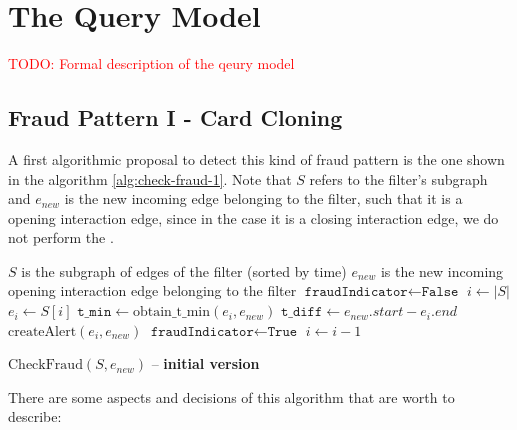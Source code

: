 \newpage
\section{The Query Model}

\textcolor{red}{TODO: Formal description of the qeury model\\}

\subsection{Fraud Pattern I - Card Cloning}

A first algorithmic proposal to detect this kind of fraud pattern is the one shown in the algorithm
\ref{alg:check-fraud-1}. Note that $S$ refers to the filter's subgraph and $e_{new}$ is the new incoming edge belonging to the filter, such that it is a opening interaction edge, since in the case it is a closing interaction edge, we do not perform the .

\begin{algorithm}[H]
    \small
    \begin{algorithmic}[1]
    \REQUIRE $S$ is the subgraph of edges of the filter (sorted by time)
    \REQUIRE $e_{new}$ is the new incoming opening interaction edge belonging to the filter 
    \STATE $\texttt{fraudIndicator} \gets \texttt{False}$
    \STATE $i \gets |S|$
      \STATE $e_i \gets S[i]$
      \STATE $\texttt{t\_min} \gets \text{obtain\_t\_min}(e_i, e_{new})$
      \STATE $\texttt{t\_diff} \gets e_{new}.start - e_i.end$
        \STATE $\text{createAlert}(e_i, e_{new})$
        \STATE $\texttt{fraudIndicator} \gets \texttt{True}$
      \ENDIF
      \STATE $i \gets i - 1$
    \ENDWHILE
    \end{algorithmic}
    \caption{$\text{CheckFraud}(S, e_{new})$ -- \textbf{initial version}}
    \label{alg:check-fraud-1}
\end{algorithm}

There are some aspects and decisions of this algorithm that are worth to describe:

